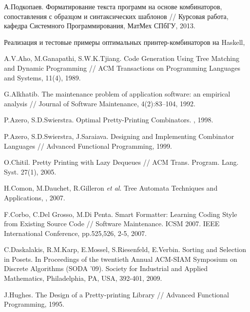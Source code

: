 
% 
% 

\begin{thebibliography}{9001}

 А.Подкопаев. Форматирование текста программ на основе комбинаторов, сопоставления с образцом и синтаксических шаблонов
// Курсовая работа, кафедра Системного Программирования, МатМех СПбГУ, 2013.

 Реализация и тестовые примеры
оптимальных принтер-комбинаторов на Haskell, 

 A.V.Aho, M.Ganapathi, S.W.K.Tjiang. Code Generation Using Tree Matching and Dynamic Programming // ACM Transactions on Programming Languages and Systems, 
11(4), 1989.


 G.Alkhatib. The maintenance problem of application software:
an empirical analysis // Journal of Software Maintenance, 4(2):83–104, 1992.

 P.Azero, S.D.Swierstra. Optimal Pretty-Printing Combinators. , 1998.

 P.Azero, S.D.Swierstra, J.Saraiava. Designing and Implementing Combinator Languages // Advanced Functional Programming, 1999.

 O.Chitil. Pretty Printing with Lazy Dequeues // ACM Trans. Program. Lang. Syst. 27(1), 2005.

 H.Comon, M.Dauchet, R.Gilleron \emph{et al}. Tree Automata Techniques and Applications, , 2007.

 F.Corbo, C.Del Grosso, M.Di Penta. Smart Formatter: Learning Coding Style from
Existing Source Code // Software Maintenance. ICSM 2007. IEEE International Conference, pp.525,526, 2-5, 2007.

 C.Daskalakis, R.M.Karp, E.Mossel, S.Riesenfeld, E.Verbin.
Sorting and Selection in Posets.
In Proceedings of the twentieth Annual ACM-SIAM Symposium on Discrete
Algorithms (SODA '09). Society for Industrial and Applied Mathematics, Philadelphia, PA, USA, 392-401, 2009.

 J.Hughes. The Design of a Pretty-printing Library // Advanced Functional Programming, 1995.


\end{thebibliography}
